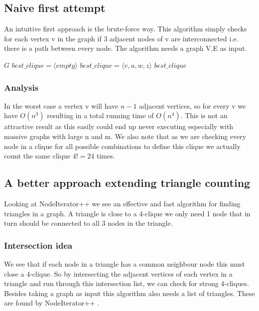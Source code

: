 \documentclass{article}
\begin{document}
\subsection{Naive first attempt}
An intuitive first approach is the brute-force way. This algorithm simply checks for each vertex v in the graph if 3 adjacent nodes of v are interconnected i.e. there is a path between every node. The algorithm needs a graph V,E as input.

\begin{algorithm}
\caption{$strong\_4clique\_finder$}
\begin{algorithmic}
\REQUIRE $G$
\STATE $best\_clique = \langle empty\rangle $
\STATE $best\_clique = \langle v,u,w,z\rangle $
\ENDIF
\ENDIF
\ENDFOR
\ENDIF
\ENDFOR
\ENDFOR
\ENDFOR
\RETURN $best\_clique$
\end{algorithmic}
\end{algorithm}

\subsubsection{Analysis}
In the worst case a vertex v will have $n-1$ adjacent vertices, so for every v we have $O(n^{3})$ resulting in a total running time of $O(n^{4})$. This is not an attractive result as this easily could end up never executing especially with massive graphs with large n and m. We also note that as we are checking every node in a clique for all possible combinations to define this clique we actually count the same clique $4! = 24$ times.

\subsection{A better approach extending triangle counting}
Looking at NodeIterator++ \cite{countingTriangles} we see an effective and fast algorithm for finding triangles in a graph. A triangle is close to a 4-clique we only need 1 node that in turn should be connected to all 3 nodes in the triangle.

\subsubsection{Intersection idea}
We see that if each node in a triangle has a common neighbour node this must close a 4-clique. So by intersecting the adjacent vertices of each vertex in a triangle and run through this intersection list, we can check for strong 4-cliques. Besides taking a graph as input this algorithm also needs a list of triangles. These are found by NodeIterator++ \cite{countingTriangles}.
\end{document}
